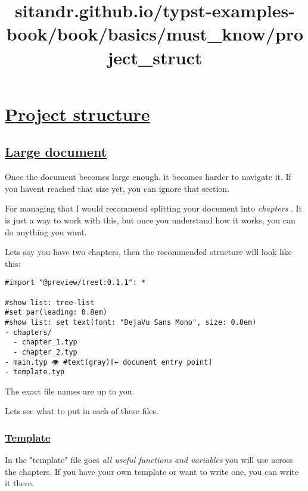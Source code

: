 \title{sitandr.github.io/typst-examples-book/book/basics/must_know/project_struct}

\section{\texorpdfstring{\hyperref[project-structure]{Project
structure}}{Project structure}}\label{project-structure}

\subsection{\texorpdfstring{\hyperref[large-document]{Large
document}}{Large document}}\label{large-document}

Once the document becomes large enough, it becomes harder to navigate
it. If you haven\textquotesingle t reached that size yet, you can ignore
that section.

For managing that I would recommend splitting your document into
\emph{chapters} . It is just a way to work with this, but once you
understand how it works, you can do anything you want.

Let\textquotesingle s say you have two chapters, then the recommended
structure will look like this:

\begin{verbatim}
#import "@preview/treet:0.1.1": *

#show list: tree-list
#set par(leading: 0.8em)
#show list: set text(font: "DejaVu Sans Mono", size: 0.8em)
- chapters/
  - chapter_1.typ
  - chapter_2.typ
- main.typ 👁 #text(gray)[← document entry point]
- template.typ
\end{verbatim}

\pandocbounded{}

The exact file names are up to you.

Let\textquotesingle s see what to put in each of these files.

\subsubsection{\texorpdfstring{\hyperref[template]{Template}}{Template}}\label{template}

In the "template" file goes \emph{all useful functions and variables}
you will use across the chapters. If you have your own template or want
to write one, you can write it there.

